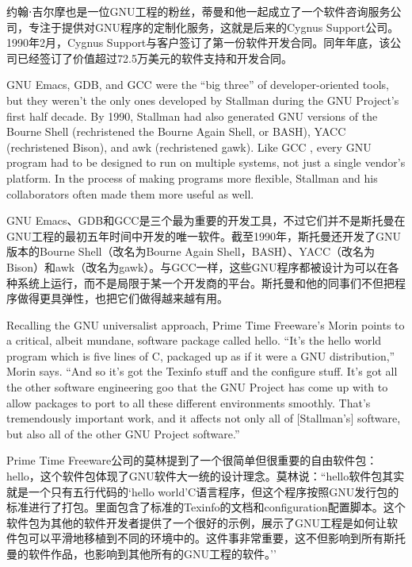 \ifdefined\chs
约翰⋅吉尔摩也是一位GNU工程的粉丝，蒂曼和他一起成立了一个软件咨询服务公司，专注于提供对GNU程序的定制化服务，这就是后来的Cygnus Support公司。1990年2月，Cygnus Support与客户签订了第一份软件开发合同。同年年底，该公司已经签订了价值超过72.5万美元的软件支持和开发合同。
\fi

\ifdefined\eng
GNU Emacs, GDB, and GCC were the ``big three'' of developer-oriented tools, but they weren't the only ones developed by Stallman during the GNU Project's first half decade. By 1990, Stallman had also generated GNU versions of the Bourne Shell (rechristened the Bourne Again Shell, or BASH), YACC (rechristened Bison), and awk (rechristened gawk). Like GCC , every GNU program had to be designed to run on multiple systems, not just a single vendor's platform. In the process of making programs more flexible, Stallman and his collaborators often made them more useful as well.
\fi

\ifdefined\chs
GNU Emacs、GDB和GCC是三个最为重要的开发工具，不过它们并不是斯托曼在GNU工程的最初五年时间中开发的唯一软件。截至1990年，斯托曼还开发了GNU版本的Bourne Shell（改名为Bourne Again Shell，BASH）、YACC（改名为Bison）和awk（改名为gawk）。与GCC一样，这些GNU程序都被设计为可以在各种系统上运行，而不是局限于某一个开发商的平台。斯托曼和他的同事们不但把程序做得更具弹性，也把它们做得越来越有用。
\fi

\ifdefined\eng
Recalling the GNU universalist approach, Prime Time Freeware's Morin points to a critical, albeit mundane, software package called hello. ``It's the hello world program which is five lines of C, packaged up as if it were a GNU distribution,'' Morin says. ``And so it's got the Texinfo stuff and the configure stuff. It's got all the other software engineering goo that the GNU Project has come up with to allow packages to port to all these different environments smoothly. That's tremendously important work, and it affects not only all of [Stallman's] software, but also all of the other GNU Project software.''
\fi

\ifdefined\chs
Prime Time Freeware公司的莫林提到了一个很简单但很重要的自由软件包：hello，这个软件包体现了GNU软件大一统的设计理念。莫林说：``hello软件包其实就是一个只有五行代码的`hello world'C语言程序，但这个程序按照GNU发行包的标准进行了打包。里面包含了标准的Texinfo的文档和configuration配置脚本。这个软件包为其他的软件开发者提供了一个很好的示例，展示了GNU工程是如何让软件包可以平滑地移植到不同的环境中的。这件事非常重要，这不但影响到所有斯托曼的软件作品，也影响到其他所有的GNU工程的软件。''
\fi

